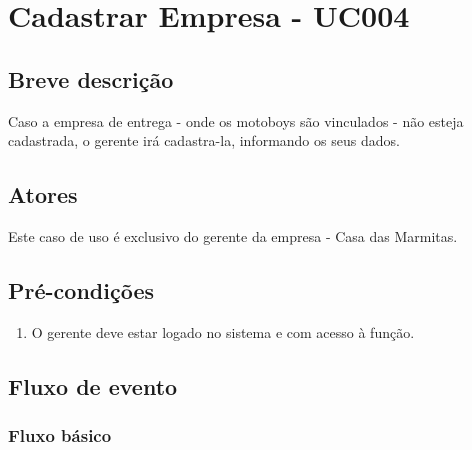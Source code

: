\chapter{Cadastrar Empresa - UC004} \label{uc004}

\section{Breve descrição}

Caso a empresa de entrega - onde os motoboys são vinculados - não esteja cadastrada, o gerente irá cadastra-la, informando os seus dados.

\section{Atores}

Este caso de uso é exclusivo do gerente da empresa - Casa das Marmitas.

\section{Pré-condições}

\begin{enumerate}
	\item O gerente deve estar logado no sistema e com acesso à função.
\end{enumerate}

\section{Fluxo de evento}

\subsection{Fluxo básico}

